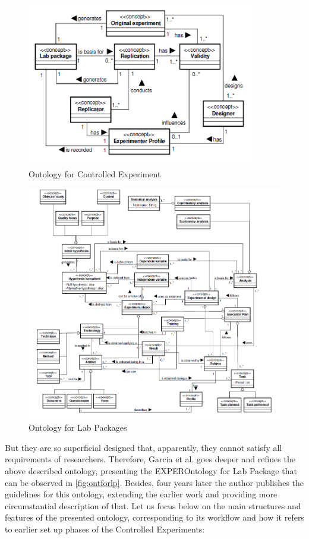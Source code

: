 	\begin{figure}
		\centering
		\includegraphics[width=10cm]{images/OntforCE.PNG}
		\caption{Ontology for Controlled Experiment\cite[p. 3]{Gar08}}
		\label{fig:ontforce}
	\end{figure}
	\begin{figure}
		\centering
		\includegraphics[width=18cm]{images/OntforLP.PNG}
		\caption{Ontology for Lab Packages\cite[p. 4]{Gar08}}
		\label{fig:ontforlp}
	\end{figure}
	But they are so superficial designed that, apparently, they cannot satisfy all requirements of researchers. Therefore, Garcia et al. goes deeper and refines the above described ontology,  presenting the EXPEROntology for Lab Package that can be observed in \autoref{fig:ontforlp}. Besides, four years later the author publishes the guidelines for this ontology\cite{Gar11}, extending the earlier work and providing more circumstantial description of that. Let us focus below on the main structures and features of the presented ontology, corresponding to its workflow and how it refers to earlier set up phases of the Controlled Experiments:
